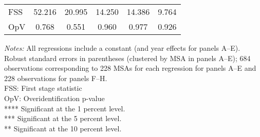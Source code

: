 \begin{table}[htbp]
\begin{tabular}{l*{5}{c}}
FSS                 &      52.216         &      20.995         &      14.250         &      14.386         &       9.764         \\
OpV                 &       0.768         &       0.551         &       0.960         &       0.977         &       0.926         \\
\hline\hline
\end{tabular}
\begin{flushleft}
\emph{Notes:} All regressions include a constant (and year effects for panels A–E). Robust standard errors in parentheses (clustered by MSA in panels A–E); 684 observations corresponding to 228 MSAs for each regression for panels A–E and 228 observations for panels F–H. \\ FSS: First stage statistic \\ OpV: Overidentification p-value \\        **** Significant at the 1 percent level. \\         *** Significant at the 5 percent level. \\         ** Significant at the 10 percent level.
\end{flushleft}
\end{table}
